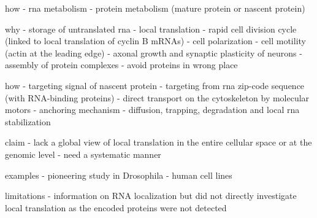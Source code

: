 
how
- rna metabolism
- protein metabolism (mature protein or nascent protein)

why
- storage of untranslated rna
- local translation
- rapid cell division cycle (linked to local translation of cyclin B mRNAs)
- cell polarization
- cell motility (actin at the leading edge)
- axonal growth and synaptic plasticity of neurons
- assembly of protein complexes
- avoid proteins in wrong place

how
- targeting signal of nascent protein
- targeting from rna zip-code sequence (with RNA-binding proteins)
- direct transport on the cytoskeleton by molecular motors
- anchoring mechanism
- diffusion, trapping, degradation and local rna stabilization

claim
- lack a global view of local translation in the entire cellular space or at the genomic level
- need a systematic manner

examples
- pioneering study in Drosophila
- human cell lines

limitations
- information on RNA localization but did not directly investigate local translation as the encoded proteins were not detected





